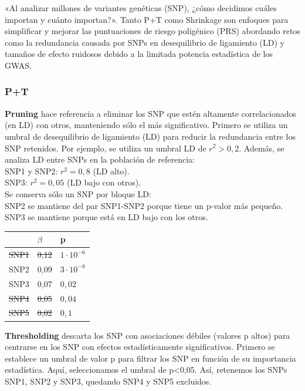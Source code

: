 «Al analizar millones de variantes genéticas (SNP), ¿cómo decidimos cuáles importan y cuánto importan?».
Tanto P+T como Shrinkage son enfoques para simplificar y mejorar las puntuaciones de riesgo poligénico (PRS) abordando retos como la redundancia causada por SNPs en desequilibrio de ligamiento (LD) y tamaños de efecto ruidosos debido a la limitada potencia estadística de los GWAS.

\subsubsection{P+T}
\textbf{Pruning} hace referencia a eliminar los SNP que estén altamente correlacionados (en LD) con otros, manteniendo sólo el más significativo. 
Primero se utiliza un umbral de desequilibrio de ligamiento (LD) para reducir la redundancia entre los SNP retenidos. Por ejemplo, se utiliza un umbral LD de $r^2 > 0,2$. Además, se analiza LD entre SNPs en la población de referencia: \\
SNP1 y SNP2: $r^2=0,8$ (LD alto).\\
SNP3: $r^2=0,05$ (LD bajo con otros).\\
Se conserva sólo un SNP por bloque LD: \\
SNP2 se mantiene del par SNP1-SNP2 porque tiene un p-valor más pequeño. \\
SNP3 se mantiene porque está en LD bajo con los otros.

\begin{table}[htbp]
\centering
\begin{tabular}{l l l}
& $\beta$ & p \\ \hline
\st{SNP1} & \st{0,12} & \st{$1 \cdot 10^{-6}$} \\
SNP2 & 0,09 & $3 \cdot 10^{-8}$ \\
SNP3 & 0,07 & $0,02$ \\
\st{SNP4} & \st{0,05} & \st{$0,04$} \\
\st{SNP5} & \st{0,02} & \st{$0,1$} \\
\end{tabular}
\end{table}

 \textbf{Thresholding} descarta los SNP con asociaciones débiles (valores p altos) para centrarse en los SNP con efectos estadísticamente significativos.
Primero se establece un umbral de valor p para filtrar los SNP en función de su importancia estadística.
Aquí, seleccionamos el umbral de p<0,05. Así, retenemos los SNPs SNP1, SNP2 y SNP3, quedando SNP4 y SNP5 excluidos.

